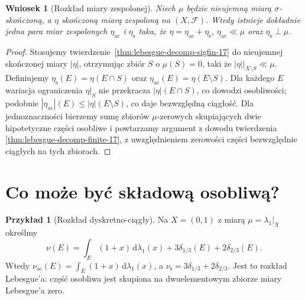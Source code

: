 \documentclass[11pt,a4paper,oneside]{book}
\numberwithin{equation}{chapter}
\theoremstyle{plain}
\newtheorem{wniosek}[twierdzenie]{Wniosek}
\theoremstyle{definition}
\newtheorem{przyklad}[twierdzenie]{Przykład}
\theoremstyle{remark}
\begin{document}
\begin{wniosek}[Rozkład miary zespolonej]
\label{cor:complex-lebesgue-decomp-17}
Niech $\mu$ będzie nieujemną miarą $\sigma$-skończoną,
a $\eta$ skończoną miarą zespoloną na $(X,\mathcal F)$.
Wtedy istnieje dokładnie jedna para miar zespolonych
$\eta_{\mathrm{ac}}$ i $\eta_{\mathrm{s}}$ taka, że
$\eta=\eta_{\mathrm{ac}}+\eta_{\mathrm{s}}$,
$\eta_{\mathrm{ac}}\ll\mu$ oraz $\eta_{\mathrm{s}}\perp\mu$.
\end{wniosek}
\begin{proof}
Stosujemy twierdzenie~\ref{thm:lebesgue-decomp-sigfin-17}
do nieujemnej skończonej miary $|\eta|$, otrzymując
zbiór $S$ o $\mu(S)=0$, taki że
$|\eta||_{X\setminus S}\ll\mu$.
Definiujemy $\eta_{\mathrm{s}}(E)=\eta(E\cap S)$
oraz $\eta_{\mathrm{ac}}(E)=\eta(E\setminus S)$.
Dla każdego $E$ wariacja ograniczenia $\eta|_S$
nie przekracza $|\eta|(E\cap S)$, co dowodzi osobliwości;
podobnie $|\eta_{\mathrm{ac}}|(E)\le|\eta|(E\setminus S)$,
co daje bezwzględną ciągłość.
Dla jednoznaczności bierzemy sumę zbiorów
$\mu$-zerowych skupiających dwie hipotetyczne części
osobliwe i powtarzamy argument z dowodu twierdzenia
\ref{thm:lebesgue-decomp-finite-17}, z uwzględnieniem
zerowości części bezwzględnie ciągłych na tych zbiorach.
\end{proof}

\section{Co może być składową osobliwą?}
\begin{przyklad}[Rozkład dyskretno-ciągły]
Na $X=(0,1)$ z miarą $\mu=\lambda_1|_X$ określmy
\[
\nu(E)=\int_E(1+x)\,\mathrm d\lambda_1(x)
       +3\delta_{1/3}(E)+2\delta_{2/3}(E).
\]
Wtedy $\nu_{\mathrm{ac}}(E)=\int_E(1+x)\,\mathrm d\lambda_1(x)$,
a $\nu_{\mathrm{s}}=3\delta_{1/3}+2\delta_{2/3}$.
Jest to rozkład Lebesgue'a: część osobliwa jest skupiona
na dwuelementowym zbiorze miary Lebesgue'a zero.
\end{przyklad}
\end{document}
